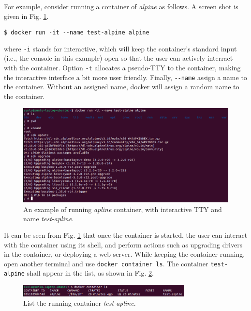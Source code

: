 For example, consider running a container of \textit{alpine} as follows. A screen shot is given in Fig. \ref{ch:vac:fig:dockerrunexp}.
\begin{lstlisting}
$ docker run -it --name test-alpine alpine
\end{lstlisting}
where \verb|-i| stands for interactive, which will keep the container's standard input (i.e., the console in this example) open so that the user can actively interract with the container. Option \verb|-t| allocates a pseudo-TTY to the container, making the interactive interface a bit more user friendly. Finally, \verb|--name| assign a name to the container. Without an assigned name, docker will assign a random name to the container.
\begin{figure}
	\centering
	\includegraphics[width=350pt]{chapters/ch-virtualization-and-containerization/figures/dockerrunexp.png}
	\caption{An example of running \textit{apline} container, with interactive TTY and name \textit{test-apline}.} \label{ch:vac:fig:dockerrunexp}
\end{figure}

It can be seen from Fig. \ref{ch:vac:fig:dockerrunexp} that once the container is started, the user can interact with the container using its shell, and perform actions such as upgrading drivers in the container, or deploying a web server. While keeping the container running, open another terminal and use \verb|docker container ls|. The container \verb|test-alpine| shall appear in the list, as shown in Fig. \ref{ch:vac:fig:dockerrunexppart2}.
\begin{figure}
	\centering
	\includegraphics[width=250pt]{chapters/ch-virtualization-and-containerization/figures/dockerrunexppart2.png}
	\caption{List the running container \textit{test-apline}.} \label{ch:vac:fig:dockerrunexppart2}
\end{figure}


